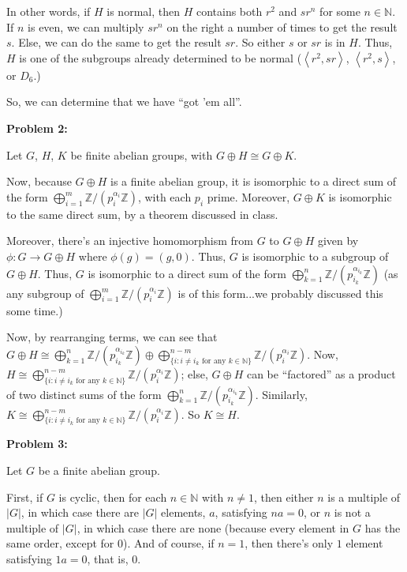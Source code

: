 \documentclass[a4paper,12pt]{article}
\newcommand{\shunt}{\vspace{20mm}}
\newcommand{\absval}[1]{\lvert #1 \rvert}
\newcommand{\anbrack}[1]{\left\langle #1 \right\rangle}
\newcommand{\al}{\alpha} %
\newcommand{\N}{\mathbb{N}}
\newcommand{\Z}{\mathbb{Z}}
\begin{document}
In other words, if $H$ is normal, then $H$ contains both $r^2$ and $sr^n$ for some $n \in \N$. If $n$ is even, we can multiply $sr^n$ on the right a number of times to get the result $s$. Else, we can do the same to get the result $sr$. So either $s$ or $sr$ is in $H$. Thus, $H$ is one of the subgroups already determined to be normal ($\anbrack{r^2,sr}$, $\anbrack{r^2,s}$, or $D_6$.)

So, we can determine that we have ``got 'em all''.

\shunt

{\bf Problem 2:}

Let $G$, $H$, $K$ be finite abelian groups, with $G \oplus H \cong G \oplus K$.

Now, because $G \oplus H$ is a finite abelian group, it is isomorphic to a direct sum of the form $\bigoplus\limits_{i=1}^m \Z/(p_i^{\al_i}\Z)$, with each $p_i$ prime. Moreover, $G \oplus K$ is isomorphic to the same direct sum, by a theorem discussed in class.

Moreover, there's an injective homomorphism from $G$ to $G \oplus H$ given by $\phi: G \to G \oplus H$ where $\phi(g) = (g,0)$. Thus, $G$ is isomorphic to a subgroup of $G \oplus H$. Thus, $G$ is isomorphic to a direct sum of the form $\bigoplus\limits_{k=1}^n \Z/(p_{i_k}^{\al_{i_k}}\Z)$ (as any subgroup of $\bigoplus\limits_{i=1}^m \Z/(p_i^{\al_i}\Z)$ is of this form...we probably discussed this some time.)

Now, by rearranging terms, we can see that $G \oplus H \cong \bigoplus\limits_{k=1}^n \Z/(p_{i_k}^{\al_{i_k}}\Z) \oplus \bigoplus\limits_{\{i: i \neq i_k \text{ for any } k \in \N\}}^{n-m} \Z/(p_i^{\al_i}\Z)$. Now, $H \cong \bigoplus\limits_{\{i: i \neq i_k \text{ for any } k \in \N\}}^{n-m} \Z/(p_i^{\al_i}\Z)$; else, $G \oplus H$ can be ``factored'' as a product of two distinct sums of the form $\bigoplus\limits_{k=1}^n \Z/(p_{i_k}^{\al_{i_k}}\Z)$. Similarly, $K \cong \bigoplus\limits_{\{i: i \neq i_k \text{ for any } k \in \N\}}^{n-m} \Z/(p_i^{\al_i}\Z)$. So $K \cong H$. 

\shunt

{\bf Problem 3:}

Let $G$ be a finite abelian group.

First, if $G$ is cyclic, then for each $n \in \N$ with $n \neq 1$, then either $n$ is a multiple of $\absval{G}$, in which case there are $\absval{G}$ elements, $a$, satisfying $na = 0$, or $n$ is not a multiple of $\absval{G}$, in which case there are none (because every element in $G$ has the same order, except for $0$). And of course, if $n = 1$, then there's only $1$ element satisfying $1a=0$, that is, $0$.
\end{document}
